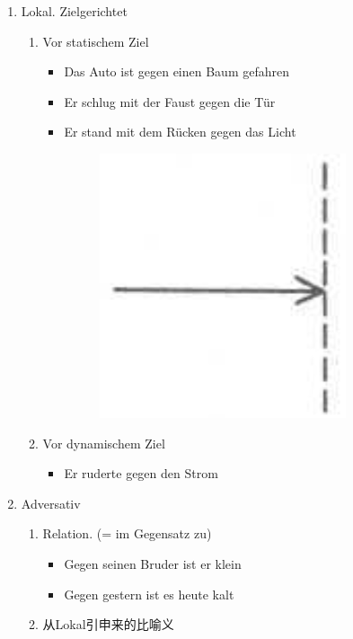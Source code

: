 \documentclass[UTF8]{report}
\begin{document}
\begin{enumerate}
    \item Lokal. Zielgerichtet
    \begin{enumerate}
        \item Vor statischem Ziel
        \begin{itemize}
            \item Das Auto ist gegen einen Baum gefahren
            \item Er schlug mit der Faust gegen die Tür
            \item Er stand mit dem Rücken gegen das Licht
            \begin{figure}[H]
                \centering
                \includegraphics[scale=0.3]{gegen.png}
            \end{figure}
        \end{itemize}
        \item Vor dynamischem Ziel
        \begin{itemize}
            \item Er ruderte gegen den Strom
        \end{itemize}
    \end{enumerate}
    \item Adversativ
    \begin{enumerate}
        \item Relation. (= im Gegensatz zu)
        \begin{itemize}
            \item Gegen seinen Bruder ist er klein
            \item Gegen gestern ist es heute kalt
        \end{itemize}
        \item 从Lokal引申来的比喻义
        \begin{itemize}

\end{itemize}
\end{enumerate}
\end{enumerate}
\end{document}
